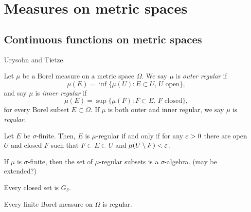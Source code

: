 \documentclass{../../large}
\begin{document}
\chapter{Measures on metric spaces}



\section{Continuous functions on metric spaces}

Urysohn and Tietze.


\begin{prb}
Let $\mu$ be a Borel measure on a metric space $\Omega$.
We say $\mu$ is \emph{outer regular} if
\[\mu(E)=\inf\{\mu(U):E\subset U,\,U\text{ open}\},\]
and say $\mu$ is \emph{inner regular} if
\[\mu(E)=\sup\{\mu(F):F\subset E,\,F\text{ closed}\},\]
for every Borel subset $E\subset\Omega$.
If $\mu$ is both outer and inner regular, we say $\mu$ is \emph{regular}.
\begin{parts}
\item Let $E$ be $\sigma$-finite. Then, $E$ is $\mu$-regular if and only if for any $\varepsilon>0$ there are open $U$ and closed $F$ such that $F\subset E\subset U$ and $\mu(U\setminus F)<\varepsilon$.
\item If $\mu$ is $\sigma$-finite, then the set of $\mu$-regular subsets is a $\sigma$-algebra. (may be extended?)
\item Every closed set is $G_\delta$.
\item Every finite Borel measure on $\Omega$ is regular.
\end{parts}
\end{prb}
\begin{pf}
\end{pf}
\end{document}
